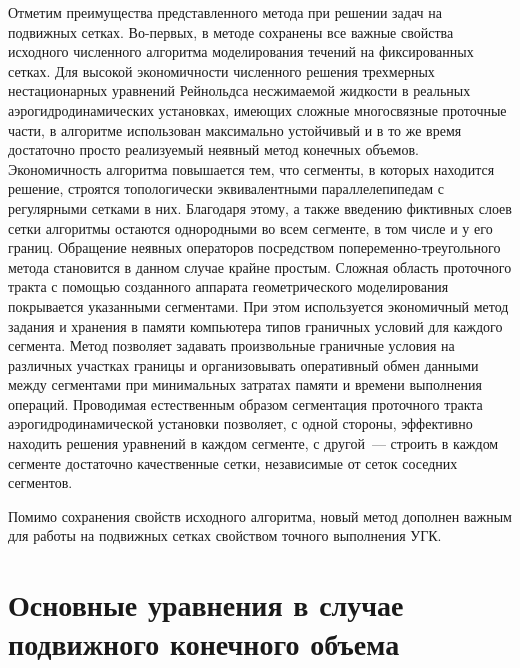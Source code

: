 Отметим преимущества представленного метода при решении задач на подвижных сетках. 
Во-первых, в методе сохранены все важные свойства 
исходного численного алгоритма моделирования течений на фиксированных сетках. Для высокой 
экономичности численного решения трехмерных нестационарных уравнений Рейнольдса несжимаемой жидкости в 
реальных аэрогидродинамических установках, имеющих сложные многосвязные проточные части, в алгоритме 
использован максимально устойчивый и в то же время достаточно просто реализуемый неявный метод конечных 
объемов. Экономичность алгоритма повышается тем, что сегменты, в которых находится решение, строятся 
топологически эквивалентными параллелепипедам с регулярными сетками в них. Благодаря этому, а также введению 
фиктивных слоев сетки алгоритмы остаются однородными во всем сегменте, в том числе и у его границ. Обращение 
неявных операторов посредством попеременно-треугольного метода становится в данном случае крайне
простым. Сложная область проточного тракта с помощью созданного аппарата геометрического моделирования 
покрывается указанными сегментами. При этом используется экономичный метод задания и хранения в 
памяти компьютера типов граничных условий для каждого сегмента. Метод позволяет задавать произвольные 
граничные условия на различных участках границы и организовывать оперативный обмен данными между сегментами 
при минимальных затратах памяти и времени выполнения операций. Проводимая естественным образом сегментация 
проточного тракта аэрогидродинамической установки позволяет, с одной стороны, эффективно находить решения 
уравнений в каждом сегменте, с другой~--- строить в каждом сегменте достаточно качественные сетки, 
независимые от сеток соседних сегментов.

Помимо сохранения свойств исходного алгоритма, новый метод дополнен 
важным для работы на подвижных сетках свойством точного выполнения УГК.

\section{Основные уравнения в случае подвижного конечного объема}
\label{s:11}
